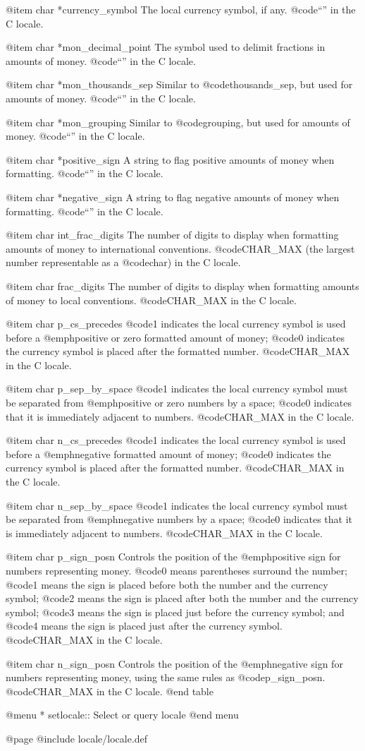 @item char *currency_symbol
The local currency symbol, if any.
@code{``''} in the C locale.

@item char *mon_decimal_point
The symbol used to delimit fractions in amounts of money.
@code{``''} in the C locale.

@item char *mon_thousands_sep
Similar to @code{thousands_sep}, but used for amounts of money.
@code{``''} in the C locale.

@item char *mon_grouping
Similar to @code{grouping}, but used for amounts of money.
@code{``''} in the C locale.

@item char *positive_sign
A string to flag positive amounts of money when formatting.
@code{``''} in the C locale.

@item char *negative_sign
A string to flag negative amounts of money when formatting.
@code{``''} in the C locale.

@item char int_frac_digits
The number of digits to display when formatting amounts of money to
international conventions.
@code{CHAR_MAX} (the largest number representable as a @code{char}) in
the C locale. 

@item char frac_digits
The number of digits to display when formatting amounts of money to
local conventions.
@code{CHAR_MAX} in the C locale. 

@item char p_cs_precedes
@code{1} indicates the local currency symbol is used before a
@emph{positive or zero} formatted amount of money; @code{0} indicates
the currency symbol is placed after the formatted number.
@code{CHAR_MAX} in the C locale. 

@item char p_sep_by_space
@code{1} indicates the local currency symbol must be separated from
@emph{positive or zero} numbers by a space; @code{0} indicates that it
is immediately adjacent to numbers.
@code{CHAR_MAX} in the C locale. 

@item char n_cs_precedes
@code{1} indicates the local currency symbol is used before a
@emph{negative} formatted amount of money; @code{0} indicates
the currency symbol is placed after the formatted number.
@code{CHAR_MAX} in the C locale. 

@item char n_sep_by_space
@code{1} indicates the local currency symbol must be separated from
@emph{negative} numbers by a space; @code{0} indicates that it
is immediately adjacent to numbers.
@code{CHAR_MAX} in the C locale. 

@item char p_sign_posn
Controls the position of the @emph{positive} sign for
numbers representing money.  @code{0} means parentheses surround the
number; @code{1} means the sign is placed before both the number and the
currency symbol; @code{2} means the sign is placed after both the number
and the currency symbol; @code{3} means the sign is placed just before
the currency symbol; and @code{4} means the sign is placed just after
the currency symbol.
@code{CHAR_MAX} in the C locale. 

@item char n_sign_posn
Controls the position of the @emph{negative} sign for numbers
representing money, using the same rules as @code{p_sign_posn}.
@code{CHAR_MAX} in the C locale. 
@end table

@menu
* setlocale::  Select or query locale
@end menu

@page
@include locale/locale.def
